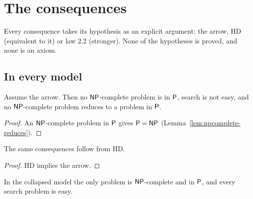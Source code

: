 \chapter{The consequences}
\label{chap:consequences}

Every consequence takes its hypothesis as an explicit argument: the arrow, HD (equivalent to it)
or law 2.2 (stronger). None of the hypotheses is proved, and none is an axiom.

\section{In every model}

\begin{theorem}
  \label{thm:model-consequences}
  \leanok
  Assume the arrow. Then no $\mathsf{NP}$-complete problem is in $\mathsf{P}$, search is not easy, and no
  $\mathsf{NP}$-complete problem reduces to a problem in $\mathsf{P}$.
\end{theorem}

\begin{proof}
  \leanok
  An $\mathsf{NP}$-complete problem in $\mathsf{P}$ gives $\mathsf{P} = \mathsf{NP}$ (Lemma~\ref{lem:npcomplete-reduces}).
\end{proof}

\begin{theorem}
  \label{thm:model-consequences-hd}
  \leanok
  The same consequences follow from HD.
\end{theorem}

\begin{proof}
  \leanok
  HD implies the arrow.
\end{proof}

\begin{proposition}
  \label{prop:consequences-need-arrow}
  \leanok
  In the collapsed model the only problem is $\mathsf{NP}$-complete and in $\mathsf{P}$, and every search problem
  is easy.
\end{proposition}

